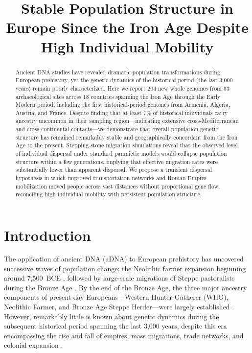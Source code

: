 \documentclass[11pt]{article}
\title{Stable Population Structure in Europe Since the Iron Age Despite High Individual Mobility}
\author{}
\date{}
\begin{document}
\maketitle

\begin{abstract}
Ancient DNA studies have revealed dramatic population transformations during European prehistory, yet the genetic dynamics of the historical period (the last 3,000 years) remain poorly characterized. Here we report 204 new whole genomes from 53 archaeological sites across 18 countries spanning the Iron Age through the Early Modern period, including the first historical-period genomes from Armenia, Algeria, Austria, and France. Despite finding that at least 7\% of historical individuals carry ancestry uncommon in their sampling region---indicating extensive cross-Mediterranean and cross-continental contacts---we demonstrate that overall population genetic structure has remained remarkably stable and geographically concordant from the Iron Age to the present. Stepping-stone migration simulations reveal that the observed level of individual dispersal under standard panmictic models would collapse population structure within a few generations, implying that effective migration rates were substantially lower than apparent dispersal. We propose a transient dispersal hypothesis in which improved transportation networks and Roman Empire mobilization moved people across vast distances without proportional gene flow, reconciling high individual mobility with persistent population structure.
\end{abstract}

\section{Introduction}

The application of ancient DNA (aDNA) to European prehistory has uncovered successive waves of population change: the Neolithic farmer expansion beginning around 7,500~BCE \citep{haak2015massive,lazaridis2014ancient}, followed by large-scale migrations of Steppe pastoralists during the Bronze Age \citep{allentoft2015population,haak2015massive}. By the end of the Bronze Age, the three major ancestry components of present-day Europeans---Western Hunter-Gatherer (WHG), Neolithic Farmer, and Bronze Age Steppe Herder---were largely established \citep{lazaridis2014ancient}. However, remarkably little is known about genetic dynamics during the subsequent historical period spanning the last 3,000 years, despite this era encompassing the rise and fall of empires, mass migrations, trade networks, and colonial expansion \citep{antonio2019ancient,olalde2019genomic}.
\end{document}
